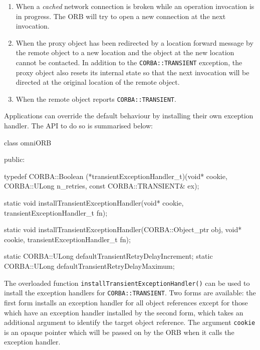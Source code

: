 \documentclass[11pt,twoside,a4paper]{book}
\newcommand{\code}[1]{\texttt{#1}}
\newcommand{\op}[1]{\texttt{#1()}}
\begin{document}
\begin{enumerate}

\item When a \emph{cached} network connection is broken while an
operation invocation is in progress. The ORB will try to open a new
connection at the next invocation.

\item When the proxy object has been redirected by a location forward
message by the remote object to a new location and the object at the
new location cannot be contacted. In addition to the
\code{CORBA::TRANSIENT} exception, the proxy object also resets its
internal state so that the next invocation will be directed at the
original location of the remote object.

\item When the remote object reports \code{CORBA::TRANSIENT}.

\end{enumerate}

Applications can override the default behaviour by installing their
own exception handler. The API to do so is summarised below:

\begin{cxxlisting}
class omniORB {
public:
  
typedef CORBA::Boolean (*transientExceptionHandler_t)(void* cookie,
                                                CORBA::ULong n_retries,
                                                const CORBA::TRANSIENT& ex);

static void installTransientExceptionHandler(void* cookie,
                                             transientExceptionHandler_t fn);

static void installTransientExceptionHandler(CORBA::Object_ptr obj,
                                             void* cookie,
                                             transientExceptionHandler_t fn);
  
static CORBA::ULong defaultTransientRetryDelayIncrement;
static CORBA::ULong defaultTransientRetryDelayMaximum;
}
\end{cxxlisting}

The overloaded function \op{installTransientExceptionHandler} can be
used to install the exception handlers for \code{CORBA::TRANSIENT}.
Two forms are available: the first form installs an exception handler
for all object references except for those which have an exception
handler installed by the second form, which takes an additional
argument to identify the target object reference. The argument
\code{cookie} is an opaque pointer which will be passed on by the ORB
when it calls the exception handler.
\end{document}
